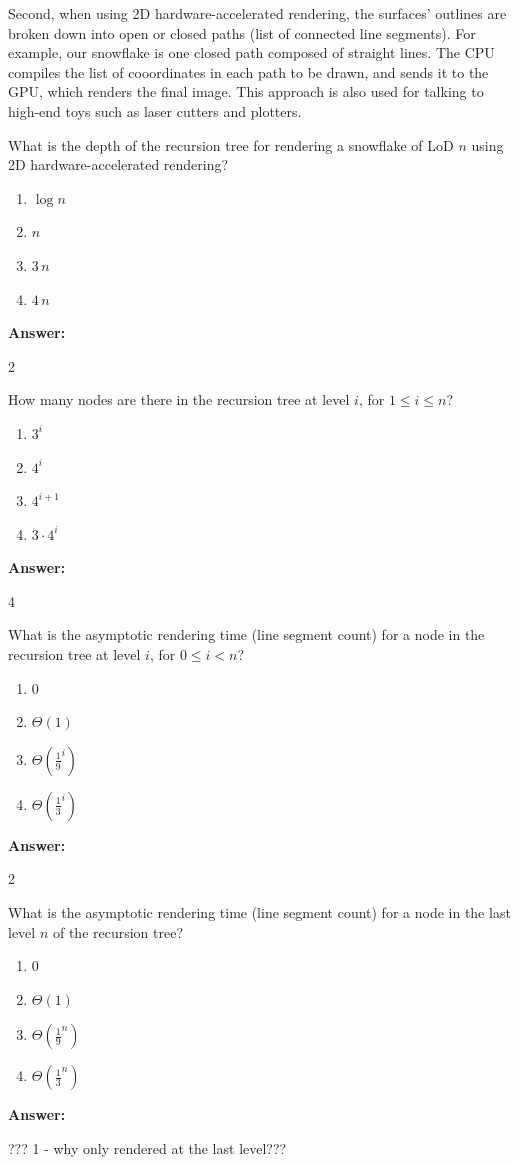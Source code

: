 \documentclass[12pt,twoside]{article}
\newcommand{\answer}{
 \par\medskip
 \textbf{Answer:}
}
\newcommand{\answerIf}{ \answer
2
}
\newcommand{\answerIg}{ \answer
4
}
\newcommand{\answerIh}{ \answer
2
}
\newcommand{\answerIi}{ \answer
??? 1 - why only rendered at the last level??? 
}
\begin{document}
\begin{problems}
Second, when using 2D hardware-accelerated rendering, the surfaces'
outlines are broken down into open or closed paths (list of connected
line segments). For example, our snowflake is one closed path composed of
straight lines. The CPU compiles the list of cooordinates in each path to be
drawn, and sends it to the GPU, which renders the final image. This approach is
also used for talking to high-end toys such as laser cutters and plotters.

\begin{problemparts}
  \problempart {} What is the depth of the recursion tree for rendering a
  snowflake of LoD $n$ using 2D hardware-accelerated rendering?
    \begin{enumerate}
      \item $\log n$
      \item $n$
      \item $3 \, n$
      \item $4 \, n$
    \end{enumerate}
\answerIf

  \problempart {} How many nodes are there in the recursion tree at level
  $i$, for $1 \le i \le n$?
    \begin{enumerate}
      \item $3 ^ i$
      \item $4 ^ i$
      \item $4 ^ {i + 1}$
      \item $3 \cdot 4 ^ i$
    \end{enumerate}
\answerIg

  \problempart {} What is the asymptotic rendering time (line segment count)
  for a node in the recursion tree at level $i$, for $0 \le i < n$?
    \begin{enumerate}
      \item $0$
      \item $\Theta(1)$
      \item $\Theta(\frac{1}{9}^i)$
      \item $\Theta(\frac{1}{3}^i)$
    \end{enumerate}
\answerIh

  \problempart {} What is the asymptotic rendering time (line segment count)
  for a node in the last level $n$ of the recursion tree?
    \begin{enumerate}
      \item $0$
      \item $\Theta(1)$
      \item $\Theta(\frac{1}{9}^n)$
      \item $\Theta(\frac{1}{3}^n)$
    \end{enumerate}
\answerIi


\end{problemparts}
\end{problems}
\end{document}
